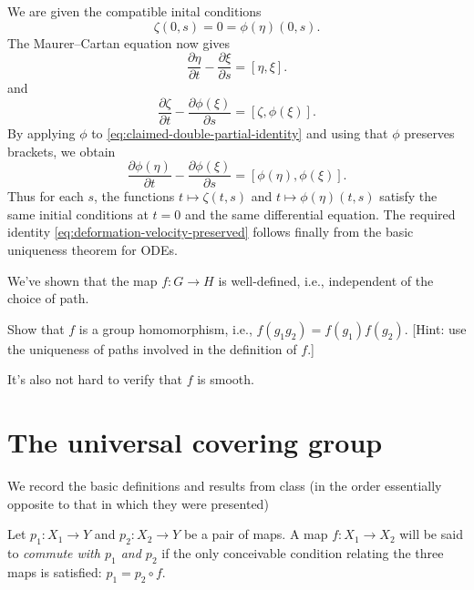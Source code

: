 \documentclass[reqno]{amsart} 
\begin{document}
We are given the compatible inital conditions
\begin{equation}\label{eq:deformation-velocity-preserved-initial-conditions}
  \zeta(0,s) = 0 = \phi(\eta)(0,s).
\end{equation}
The Maurer--Cartan equation now gives
\begin{equation}\label{eq:claimed-double-partial-identity}
  \frac{\partial \eta }{ \partial t } - \frac{\partial \xi
  }{ \partial s}
  = [\eta,\xi].
\end{equation}
and
\begin{equation*}
  \frac{\partial \zeta }{ \partial t } - \frac{\partial \phi(\xi) }{ \partial s} = [\zeta,\phi(\xi)].
\end{equation*}
By applying $\phi$ to \eqref{eq:claimed-double-partial-identity} and using that $\phi$ preserves brackets, we obtain
\begin{equation*}
  \frac{\partial \phi(\eta) }{ \partial t } - \frac{\partial \phi(\xi) }{ \partial s} = [\phi(\eta),\phi(\xi)].
\end{equation*}
Thus for each $s$, the functions $t \mapsto \zeta(t,s)$ and $t \mapsto \phi(\eta)(t,s)$ satisfy the same initial conditions at $t = 0$ and the same differential equation.  The required identity \eqref{eq:deformation-velocity-preserved} follows finally from the basic uniqueness theorem for ODEs.

We've shown that the map $f : G \rightarrow H$ is well-defined, i.e., independent of the choice of path.
\begin{exercise}
  Show that $f$ is a group homomorphism, i.e., $f(g_1 g_2) = f(g_1) f(g_2)$.  [Hint: use the uniqueness of paths involved in the definition of $f$.]
\end{exercise}
It's also not hard to verify that $f$ is smooth.
\section{The universal covering group}
\label{sec:org1f9aec4}
We record the basic definitions and results from class (in the order essentially opposite to that in which they were presented)

\begin{definition}
  Let $p_1 : X_1 \rightarrow Y$ and $p_2 : X_2 \rightarrow Y$ be a pair of maps.  A map $f : X_1 \rightarrow X_2$ will be said to \emph{commute with $p_1$ and $p_2$} if the only conceivable condition relating the three maps is satisfied: $p_1 = p_2 \circ f$.
\end{definition}
\end{document}
